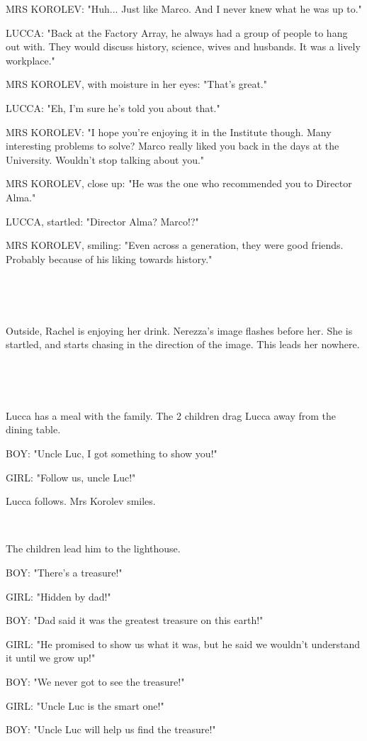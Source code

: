 \documentclass[11pt]{article}
\begin{document}
MRS KOROLEV: "Huh... Just like Marco.
And I never knew what he was up to."

LUCCA: "Back at the Factory Array, he always had a group of people to hang out with.
They would discuss history, science, wives and husbands.
It was a lively workplace."

MRS KOROLEV, with moisture in her eyes: "That's great."

LUCCA: "Eh, I'm sure he's told you about that."

MRS KOROLEV: "I hope you're enjoying it in the Institute though. 
Many interesting problems to solve?
Marco really liked you back in the days at the University.
Wouldn't stop talking about you."

MRS KOROLEV, close up: "He was the one who recommended you to Director Alma."

LUCCA, startled: "Director Alma? Marco!?"

MRS KOROLEV, smiling: "Even across a generation, they were good friends.
Probably because of his liking towards history."

\ 

\ 

Outside, Rachel is enjoying her drink.
Nerezza's image flashes before her.
She is startled, and starts chasing in the direction of the image.
This leads her nowhere.

\ 

\ 

Lucca has a meal with the family. 
The 2 children drag Lucca away from the dining table.

BOY: "Uncle Luc, I got something to show you!"

GIRL: "Follow us, uncle Luc!"

Lucca follows. Mrs Korolev smiles.

\ 

The children lead him to the lighthouse.

BOY: "There's a treasure!"

GIRL: "Hidden by dad!"

BOY: "Dad said it was the greatest treasure on this earth!"

GIRL: "He promised to show us what it was, but he said we wouldn't understand it until we grow up!"

BOY: "We never got to see the treasure!" 

GIRL: "Uncle Luc is the smart one!"

BOY: "Uncle Luc will help us find the treasure!"
\end{document}

